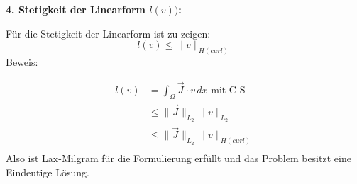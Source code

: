 \textbf{4. Stetigkeit der Linearform $l(v))$:}\par
F\"ur die Stetigkeit der Linearform ist zu zeigen:
\begin{equation}
	l(v) \leq \|v\|_{H(curl)}
\end{equation}
Beweis:
\par
\begin{align}
	l(v) &= \int_\Omega \vec{J}\cdot v\,dx \textrm{   mit C-S}\\
	&\leq \|\vec{J}\|_{L_2} \|v\|_{L_2}\\
	&\leq \|\vec{J}\|_{L_2} \|v\|_{H(curl)}\\
\end{align}
Also ist Lax-Milgram f\"ur die Formulierung erf\"ullt und das Problem besitzt eine Eindeutige L\"osung.

